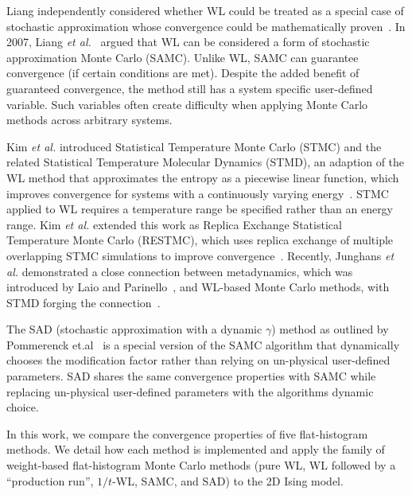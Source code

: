 Liang independently considered whether WL could be treated as a special case of
stochastic approximation whose convergence could be mathematically
proven~\cite{liang2006theory, liang2007stochastic}. In 2007, Liang \emph{et
al.}~\cite{liang2007stochastic} argued that WL can be considered a form of
stochastic approximation Monte Carlo (SAMC). Unlike WL, SAMC can guarantee
convergence (if certain conditions are met). Despite the added benefit of
guaranteed convergence, the method still has a system specific user-defined
variable. Such variables often create difficulty when applying Monte Carlo
methods across arbitrary systems.

Kim \emph{et al.} introduced Statistical Temperature Monte Carlo (STMC) and the
related Statistical Temperature Molecular Dynamics (STMD), an adaption
of the WL method that approximates the entropy as a piecewise linear function,
which improves convergence for systems with a continuously varying
energy~\cite{kim2006statistical, kim2007statistical}. STMC applied to WL
requires a temperature range be specified rather than an energy range.  Kim
\emph{et al.} extended this work as Replica Exchange Statistical Temperature
Monte Carlo (RESTMC), which uses replica exchange of multiple overlapping STMC
simulations to improve convergence~\cite{kim2009replica}. Recently,
Junghans \emph{et al.} demonstrated a close connection between
metadynamics, which was introduced by Laio and
Parinello~\cite{laio2002escaping}, and WL-based Monte Carlo methods, with STMD
forging the connection~\cite{junghans2014molecular}.

The SAD (stochastic approximation with a
dynamic $\gamma$) method as outlined by Pommerenck
et.al~\cite{pommerenck2020stochastic} is a special version of the SAMC algorithm
that dynamically chooses the modification factor rather than relying on
un-physical user-defined parameters. SAD shares the same convergence properties
with SAMC while replacing un-physical user-defined parameters with the
algorithms dynamic choice.

In this work, we compare the convergence properties of five flat-histogram
methods. We detail how each method is implemented and apply the family of
weight-based flat-histogram Monte Carlo methods (pure WL, WL followed by a
``production run'', $1/t$-WL, SAMC, and SAD) to the 2D Ising model.


